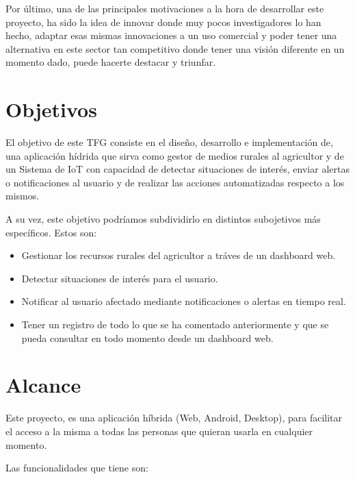 Por último, una de las principales motivaciones a la hora de desarrollar este proyecto, ha sido la idea de innovar donde muy pocos investigadores lo han hecho, adaptar esas mismas innovaciones a un uso comercial y poder tener una alternativa en este sector tan competitivo donde tener una visión diferente en un momento dado, puede hacerte destacar y triunfar.

\section{Objetivos}
El objetivo de este TFG consiste en el diseño, desarrollo e implementación de, una aplicación hídrida que sirva como gestor de medios rurales al agricultor y de un Sistema de IoT con capacidad de detectar situaciones de interés, enviar alertas o notificaciones al usuario y de realizar las acciones automatizadas respecto a los mismos.

A su vez, este objetivo podríamos subdividirlo en distintos subojetivos más específicos. Estos son:

\begin{itemize}
    \item Gestionar los recursos rurales del agricultor a tráves de un dashboard web.
    \item Detectar situaciones de interés para el usuario.
    \item Notificar al usuario afectado mediante notificaciones o alertas en tiempo real.
    \item Tener un registro de todo lo que se ha comentado anteriormente y que se pueda consultar en todo momento desde un dashboard web.
\end{itemize}

\section{Alcance}
Este proyecto, es una aplicación híbrida (Web, Android, Desktop), para facilitar el acceso a la misma a todas las personas que quieran usarla en cualquier momento.

Las funcionalidades que tiene son:

